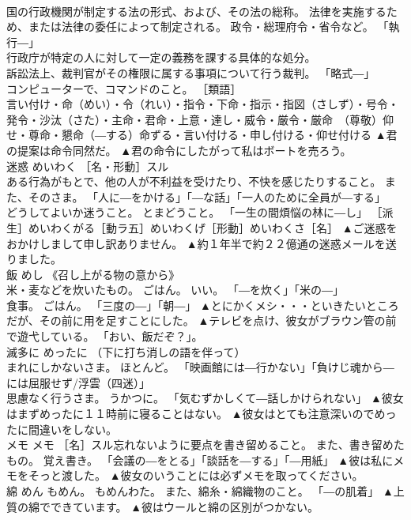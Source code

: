 \documentclass[8pt]{extreport}
\begin{document}
\begin{CJK}{UTF8}{min}
\\	国の行政機関が制定する法の形式、および、その法の総称。 法律を実施するため、または法律の委任によって制定される。 政令・総理府令・省令など。 「執行―」 
\\	行政庁が特定の人に対して一定の義務を課する具体的な処分。 
\\	訴訟法上、裁判官がその権限に属する事項について行う裁判。 「略式―」 
\\	コンピューターで、コマンドのこと。 ［類語］
\\	言い付け・命（めい）・令（れい）・指令・下命・指示・指図（さしず）・号令・発令・沙汰（さた）・主命・君命・上意・達し・威令・厳令・厳命　（尊敬）仰せ・尊命・懇命（―する）命ずる・言い付ける・申し付ける・仰せ付ける	▲君の提案は命令同然だ。 ▲君の命令にしたがって私はボートを売ろう。
\\	迷惑	めいわく	［名・形動］スル 
\\	ある行為がもとで、他の人が不利益を受けたり、不快を感じたりすること。 また、そのさま。 「人に―をかける」「―な話」「一人のために全員が―する」 
\\	どうしてよいか迷うこと。 とまどうこと。 「一生の間煩悩の林に―し」 ［派生］めいわくがる［動ラ五］めいわくげ［形動］めいわくさ［名］	▲ご迷惑をおかけしまして申し訳ありません。 ▲約１年半で約２２億通の迷惑メールを送りました。
\\	飯	めし	《召し上がる物の意から》 
\\	米・麦などを炊いたもの。 ごはん。 いい。 「―を炊く」「米の―」 
\\	食事。 ごはん。 「三度の―」「朝―」	▲とにかくメシ・・・といきたいところだが、その前に用を足すことにした。 ▲テレビを点け、彼女がブラウン管の前で遊弋している。 「おい、飯だぞ？」。
\\	滅多に	めったに	（下に打ち消しの語を伴って） 
\\	まれにしかないさま。 ほとんど。 「映画館には―行かない」「負けじ魂から―には屈服せず/浮雲（四迷）」 
\\	思慮なく行うさま。 うかつに。 「気むずかしくて―話しかけられない」	▲彼女はまずめったに１１時前に寝ることはない。 ▲彼女はとても注意深いのでめったに間違いをしない。
\\	メモ	メモ	［名］スル忘れないように要点を書き留めること。 また、書き留めたもの。 覚え書き。 「会議の―をとる」「談話を―する」「―用紙」	▲彼は私にメモをそっと渡した。 ▲彼女のいうことには必ずメモを取ってください。
\\	綿	めん	もめん。 もめんわた。 また、綿糸・綿織物のこと。 「―の肌着」	▲上質の綿でできています。 ▲彼はウールと綿の区別がつかない。

\end{CJK}
\end{document}
